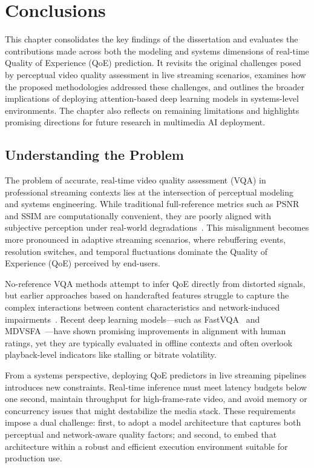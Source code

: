 \chapter{Conclusions} \label{chap:ch5}

This chapter consolidates the key findings of the dissertation and evaluates the contributions made across both the modeling and systems dimensions of real-time Quality of Experience (QoE) prediction. It revisits the original challenges posed by perceptual video quality assessment in live streaming scenarios, examines how the proposed methodologies addressed these challenges, and outlines the broader implications of deploying attention-based deep learning models in systems-level environments. The chapter also reflects on remaining limitations and highlights promising directions for future research in multimedia AI deployment.

\section{Understanding the Problem}

The problem of accurate, real-time video quality assessment (VQA) in professional streaming contexts lies at the intersection of perceptual modeling and systems engineering. While traditional full-reference metrics such as PSNR and SSIM are computationally convenient, they are poorly aligned with subjective perception under real-world degradations~\cite{huynh2012scope,wang2004ssim}. This misalignment becomes more pronounced in adaptive streaming scenarios, where rebuffering events, resolution switches, and temporal fluctuations dominate the Quality of Experience (QoE) perceived by end-users.

No-reference VQA methods attempt to infer QoE directly from distorted signals, but earlier approaches based on handcrafted features struggle to capture the complex interactions between content characteristics and network-induced impairments~\cite{min2024perceptual}. Recent deep learning models—such as FastVQA~\cite{wu2022fastvqa} and MDVSFA~\cite{li2023unified}—have shown promising improvements in alignment with human ratings, yet they are typically evaluated in offline contexts and often overlook playback-level indicators like stalling or bitrate volatility.

From a systems perspective, deploying QoE predictors in live streaming pipelines introduces new constraints. Real-time inference must meet latency budgets below one second, maintain throughput for high-frame-rate video, and avoid memory or concurrency issues that might destabilize the media stack. These requirements impose a dual challenge: first, to adopt a model architecture that captures both perceptual and network-aware quality factors; and second, to embed that architecture within a robust and efficient execution environment suitable for production use.

